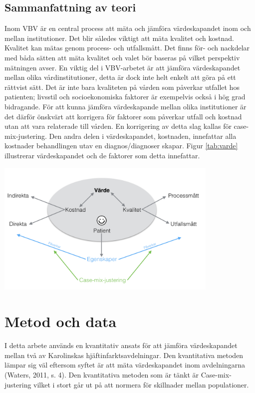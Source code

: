 \subsection{Sammanfattning av teori}

Inom VBV är en central process att mäta och jämföra värdeskapandet inom och mellan institutioner. Det blir således viktigt att mäta kvalitet och kostnad. Kvalitet kan mätas genom process- och utfallsmått. Det finns för- och nackdelar med båda sätten att mäta kvalitet och valet bör baseras på vilket perspektiv mätningen avser. En viktig del i VBV-arbetet är att jämföra värdeskapandet mellan olika vårdinstitutioner, detta är dock inte helt enkelt att göra på ett rättvist sätt. Det är inte bara kvaliteten på vården som påverkar utfallet hos patienten; livsstil och socioekonomiska faktorer är exempelvis också i hög grad bidragande. För att kunna jämföra värdeskapande mellan olika institutioner är det därför önskvärt att korrigera för faktorer som påverkar utfall och kostnad utan att vara relaterade till vården. En korrigering av detta slag kallas för case-mix-justering. Den andra delen i värdeskapandet, kostnaden, innefattar alla kostnader behandlingen utav en diagnos/diagnoser skapar. Figur \ref{tab:varde} illustrerar värdeskapandet och de faktorer som detta innefattar.

\noindent\begin{minipage}{\textwidth}
\centering
\includegraphics[width=0.8\textwidth]{varde}
\label{tab:varde}            
\end{minipage}

\section{Metod och data}

I detta arbete används en kvantitativ ansats för att jämföra värdeskapandet mellan två av Karolinskas hjäftinfarktsavdelningar. Den kvantitativa metoden lämpar sig väl eftersom syftet är att mäta värdeskapandet inom avdelningarna (Waters, 2011, s. 4). Den kvantitativa metoden som är tänkt är Case-mix-justering vilket i stort går ut på att normera för skillnader mellan populationer. 


